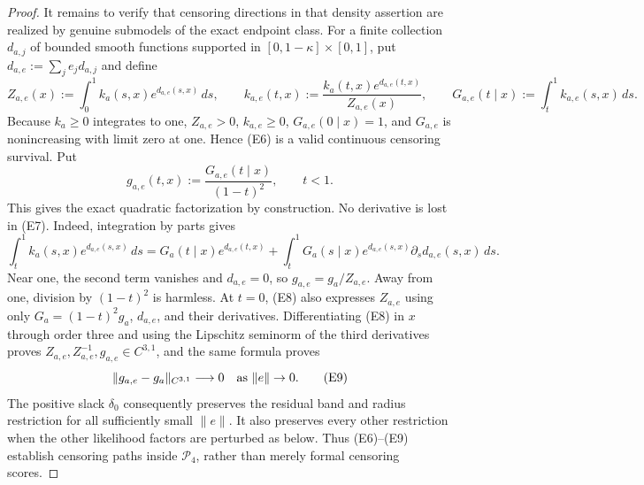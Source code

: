 \documentclass{article}
\begin{document}
\begin{proof}
It remains to verify that censoring directions in that density assertion are realized by genuine submodels of the exact endpoint class.  For a finite collection \(d_{a,j}\) of bounded smooth functions supported in \([0,1-\kappa]\times[0,1]\), put \(d_{a,e}:=\sum_je_jd_{a,j}\) and define
\[
 Z_{a,e}(x):=\int_0^1k_a(s,x)e^{d_{a,e}(s,x)}\,ds,\qquad
 k_{a,e}(t,x):=\frac{k_a(t,x)e^{d_{a,e}(t,x)}}{Z_{a,e}(x)},\qquad
 G_{a,e}(t\mid x):=\int_t^1k_{a,e}(s,x)\,ds.                           \tag{E6}
\]
Because \(k_a\ge0\) integrates to one, \(Z_{a,e}>0\), \(k_{a,e}\ge0\), \(G_{a,e}(0\mid x)=1\), and \(G_{a,e}\) is nonincreasing with limit zero at one.  Hence (E6) is a valid continuous censoring survival.  Put
\[
 g_{a,e}(t,x):=\frac{G_{a,e}(t\mid x)}{(1-t)^2},\qquad t<1.             \tag{E7}
\]
This gives the exact quadratic factorization by construction.  No derivative is lost in (E7).  Indeed, integration by parts gives
\[
 \int_t^1k_a(s,x)e^{d_{a,e}(s,x)}\,ds
 =G_a(t\mid x)e^{d_{a,e}(t,x)}
  +\int_t^1G_a(s\mid x)e^{d_{a,e}(s,x)}
                   \partial_sd_{a,e}(s,x)\,ds.                         \tag{E8}
\]
Near one, the second term vanishes and \(d_{a,e}=0\), so \(g_{a,e}=g_a/Z_{a,e}\).  Away from one, division by \((1-t)^2\) is harmless.  At \(t=0\), (E8) also expresses \(Z_{a,e}\) using only \(G_a=(1-t)^2g_a\), \(d_{a,e}\), and their derivatives.  Differentiating (E8) in \(x\) through order three and using the Lipschitz seminorm of the third derivatives proves \(Z_{a,e},Z_{a,e}^{-1},g_{a,e}\in C^{3,1}\), and the same formula proves
\[
 \lVert g_{a,e}-g_a\rVert_{C^{3,1}}\longrightarrow0
 \quad\hbox{as }\lVert e\rVert\to0.                                  \tag{E9}
\]
The positive slack \(\delta_0\) consequently preserves the residual band and radius restriction for all sufficiently small \(\lVert e\rVert\).  It also preserves every other restriction when the other likelihood factors are perturbed as below.  Thus (E6)--(E9) establish censoring paths inside \(\mathcal P_4\), rather than merely formal censoring scores.


\end{proof}
\end{document}
